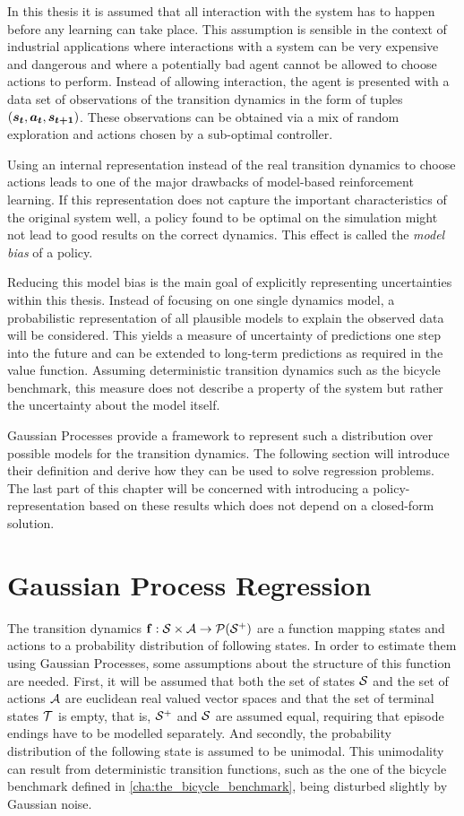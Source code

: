 In this thesis it is assumed that all interaction with the system has to happen before any learning can take place.
This assumption is sensible in the context of industrial applications where interactions with a system can be very expensive and dangerous and where a potentially bad agent cannot be allowed to choose actions to perform.
Instead of allowing interaction, the agent is presented with a data set of observations of the transition dynamics in the form of tuples $(\bm{s_t}, \bm{a_t}, \bm{s_{t+1}})$.
These observations can be obtained via a mix of random exploration and actions chosen by a sub-optimal controller.

Using an internal representation instead of the real transition dynamics to choose actions leads to one of the major drawbacks of model-based reinforcement learning.
If this representation does not capture the important characteristics of the original system well, a policy found to be optimal on the simulation might not lead to good results on the correct dynamics.
This effect is called the \emph{model bias} of a policy.

Reducing this model bias is the main goal of explicitly representing uncertainties within this thesis.
Instead of focusing on one single dynamics model, a probabilistic representation of all plausible models to explain the observed data will be considered.
This yields a measure of uncertainty of predictions one step into the future and can be extended to long-term predictions as required in the value function.
Assuming deterministic transition dynamics such as the bicycle benchmark, this measure does not describe a property of the system but rather the uncertainty about the model itself.

Gaussian Processes provide a framework to represent such a distribution over possible models for the transition dynamics.
The following section will introduce their definition and derive how they can be used to solve regression problems.
The last part of this chapter will be concerned with introducing a policy-representation based on these results which does not depend on a closed-form solution.

\section{Gaussian Process Regression}
The transition dynamics $\operatorname{\mathbf{f}} : \mathcal{S} \times \mathcal{A} \to \operatorname{\mathcal{P}}(\mathcal{S}^+)$ are a function mapping states and actions to a probability distribution of following states.
In order to estimate them using Gaussian Processes, some assumptions about the structure of this function are needed.
First, it will be assumed that both the set of states $\mathcal{S}$ and the set of actions $\mathcal{A}$ are euclidean real valued vector spaces and that the set of terminal states $\mathcal{T}$ is empty, that is, $\mathcal{S}^+$ and $\mathcal{S}$ are assumed equal, requiring that episode endings have to be modelled separately.
And secondly, the probability distribution of the following state is assumed to be unimodal.
This unimodality can result from deterministic transition functions, such as the one of the bicycle benchmark defined in \cref{cha:the_bicycle_benchmark}, being disturbed slightly by Gaussian noise.

